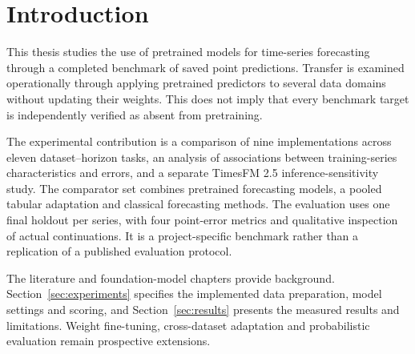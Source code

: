 \newpage
\section{Introduction}
This thesis studies the use of pretrained models for time-series forecasting through a completed benchmark of saved point predictions. Transfer is examined operationally through applying pretrained predictors to several data domains without updating their weights. This does not imply that every benchmark target is independently verified as absent from pretraining.

The experimental contribution is a comparison of nine implementations across eleven dataset--horizon tasks, an analysis of associations between training-series characteristics and errors, and a separate TimesFM 2.5 inference-sensitivity study. The comparator set combines pretrained forecasting models, a pooled tabular adaptation and classical forecasting methods. The evaluation uses one final holdout per series, with four point-error metrics and qualitative inspection of actual continuations. It is a project-specific benchmark rather than a replication of a published evaluation protocol.

The literature and foundation-model chapters provide background. Section~\ref{sec:experiments} specifies the implemented data preparation, model settings and scoring, and Section~\ref{sec:results} presents the measured results and limitations. Weight fine-tuning, cross-dataset adaptation and probabilistic evaluation remain prospective extensions.
